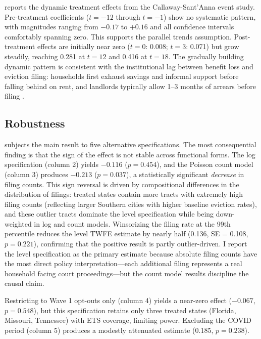 \documentclass[12pt]{article}
\begin{document}


 reports the dynamic treatment effects from the Callaway-Sant'Anna event study. Pre-treatment coefficients ($t = -12$ through $t = -1$) show no systematic pattern, with magnitudes ranging from $-0.17$ to $+0.16$ and all confidence intervals comfortably spanning zero. This supports the parallel trends assumption. Post-treatment effects are initially near zero ($t = 0$: 0.008; $t = 3$: 0.071) but grow steadily, reaching 0.281 at $t = 12$ and 0.416 at $t = 18$. The gradually building dynamic pattern is consistent with the institutional lag between benefit loss and eviction filing: households first exhaust savings and informal support before falling behind on rent, and landlords typically allow 1--3 months of arrears before filing \citep{Gromis2022EvictionTimeline}.

\subsection{Robustness}



 subjects the main result to five alternative specifications. The most consequential finding is that the sign of the effect is not stable across functional forms. The log specification (column 2) yields $-0.116$ ($p = 0.454$), and the Poisson count model (column 3) produces $-0.213$ ($p = 0.037$), a statistically significant \emph{decrease} in filing counts. This sign reversal is driven by compositional differences in the distribution of filings: treated states contain more tracts with extremely high filing counts (reflecting larger Southern cities with higher baseline eviction rates), and these outlier tracts dominate the level specification while being down-weighted in log and count models. Winsorizing the filing rate at the 99th percentile reduces the level TWFE estimate by nearly half (0.136, SE = 0.108, $p = 0.221$), confirming that the positive result is partly outlier-driven. I report the level specification as the primary estimate because absolute filing counts have the most direct policy interpretation---each additional filing represents a real household facing court proceedings---but the count model results discipline the causal claim.

Restricting to Wave 1 opt-outs only (column 4) yields a near-zero effect ($-0.067$, $p = 0.548$), but this specification retains only three treated states (Florida, Missouri, Tennessee) with ETS coverage, limiting power. Excluding the COVID period (column 5) produces a modestly attenuated estimate (0.185, $p = 0.238$).
\end{document}
